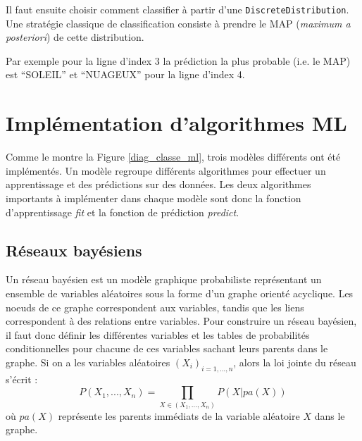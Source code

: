 Il faut ensuite choisir comment classifier à partir d’une \texttt{DiscreteDistribution}. Une stratégie classique de classification consiste à prendre le MAP (\textit{maximum a posteriori}) de cette distribution.

Par exemple pour la ligne d'index 3 la prédiction la plus probable (i.e. le MAP) est “SOLEIL” et “NUAGEUX” pour la ligne d'index 4.

\chapter{Implémentation d'algorithmes ML}

Comme le montre la Figure \ref{diag_classe_ml}, trois modèles différents ont été implémentés. Un modèle regroupe différents algorithmes pour effectuer un apprentissage et des prédictions sur des données. Les deux algorithmes importants à implémenter dans chaque modèle sont donc la fonction d’apprentissage \textit{fit}  et la fonction de prédiction \textit{predict}.

\clearpage
\section{Réseaux bayésiens}

Un réseau bayésien \cite{neapolitan_learning_2007} est un modèle graphique probabiliste représentant un ensemble de variables
aléatoires sous la forme d'un graphe orienté acyclique. Les noeuds de ce graphe correspondent aux
variables, tandis que les liens correspondent à des relations entre variables. Pour construire un
réseau bayésien, il faut donc définir les différentes variables et les tables de probabilités
conditionnelles pour chacune de ces variables sachant leurs parents dans le graphe. Si on a les variables aléatoires $(X_{i})_{i=1,...,n}$, alors la loi jointe du réseau s’écrit :
$$P(X_{1}, ...,X_{n})= \prod_{X \in (X_{1}, ...,X_{n})} P(X|pa(X))$$
où $pa(X)$ représente les parents immédiats de la variable aléatoire $X$ dans le graphe.

